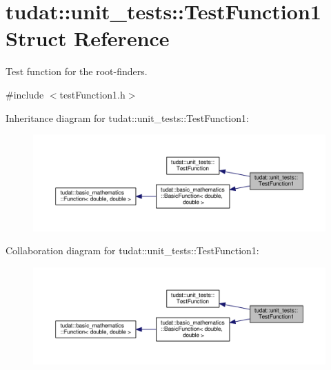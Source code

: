 \hypertarget{structtudat_1_1unit__tests_1_1TestFunction1}{}\section{tudat\+:\+:unit\+\_\+tests\+:\+:Test\+Function1 Struct Reference}
\label{structtudat_1_1unit__tests_1_1TestFunction1}


Test function for the root-\/finders.  




{\ttfamily \#include $<$test\+Function1.\+h$>$}



Inheritance diagram for tudat\+:\+:unit\+\_\+tests\+:\+:Test\+Function1\+:
\nopagebreak
\begin{figure}[H]
\begin{center}
\leavevmode
\includegraphics[width=350pt]{structtudat_1_1unit__tests_1_1TestFunction1__inherit__graph}
\end{center}
\end{figure}


Collaboration diagram for tudat\+:\+:unit\+\_\+tests\+:\+:Test\+Function1\+:
\nopagebreak
\begin{figure}[H]
\begin{center}
\leavevmode
\includegraphics[width=350pt]{structtudat_1_1unit__tests_1_1TestFunction1__coll__graph}
\end{center}
\end{figure}
